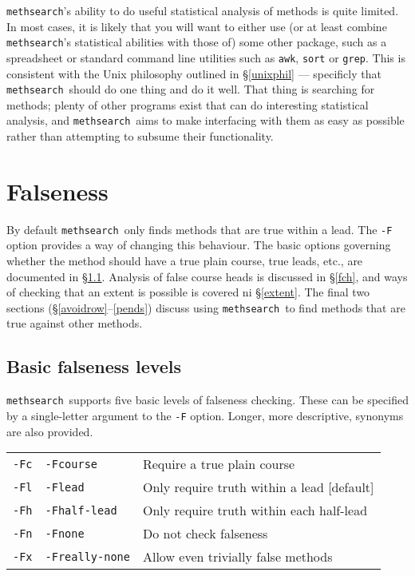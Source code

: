 \documentclass[a4paper,11pt,oneside]{book}
\makeatletter
\newcommand{\oidx}[2]{\index{#1@{\hspace*{-\optwidth}\texttt{-}#2}|ulink}}
\newcommand{\oid}[2]{\oidx{#1}{\texttt{#1}}%
  \index{#2@{\hspace*{-\loptwidth}\texttt{--#2}}|see{\texttt{-#1}}}}
\newcommand{\oidF}[2]{\oidx{F#1}{\texttt{F#1}}%
  \index{F#2@{\hspace*{-\optwidth}\texttt{-F#2}}|see{\texttt{-F#1}}}}
\def\methsearch{\texttt{meth\-search}}
\newcommand{\sref}[1]{\hyperref[#1]{\S\ref{#1}}}
\makeatother
\begin{document}
\methsearch's ability to do useful statistical analysis of methods is 
quite limited.  In most cases, it is likely that you will want to either
use (or at least combine \methsearch's statistical abilities with those of) 
some other package, such as a spreadsheet or standard 
command line utilities such as \verb+awk+, 
\verb+sort+ or \verb+grep+.
This is consistent with the Unix philosophy outlined in \sref{unixphil} ---
specificly that \methsearch\ should do one thing and do it well.  That thing
is searching for methods; plenty of other programs exist that can do
interesting statistical analysis, and \methsearch\ aims to make interfacing
with them as easy as possible rather than attempting to subsume their 
functionality.




\chapter{Falseness}\label{falseness}

By default \methsearch\ only finds methods that are true within a lead.
The \verb+-F+ option\oid{F}{falseness} provides a way of changing this 
behaviour.  The basic options governing whether the method should have 
a true plain course, true leads, etc., are documented in \sref{basic_false}.
Analysis of false course heads is discussed in \sref{fch}, and ways of 
checking that an extent is possible is covered ni \sref{extent}.
The final two sections (\sref{avoidrow}--\ref{pends}) discuss using 
\methsearch\ to find methods that are true against other methods.


\section{Basic falseness levels}\label{basic_false}

\methsearch\ supports five basic levels of falseness checking.  These
can be specified by a single-letter argument to the \verb+-F+ option.  
Longer, more descriptive, synonyms are also provided.

\begin{tabular}{lll}
\verb+-Fc+& \verb+-Fcourse+&      Require a true plain course\oidF{c}{course}\\
\verb+-Fl+& \verb+-Flead+&        Only require truth within a lead [default]\\
\verb+-Fh+& \verb+-Fhalf-lead+&   Only require truth within each half-lead\\
\verb+-Fn+& \verb+-Fnone+&        Do not check falseness\\
\verb+-Fx+& \verb+-Freally-none+& Allow even trivially false methods\\
\end{tabular}
\end{document}
